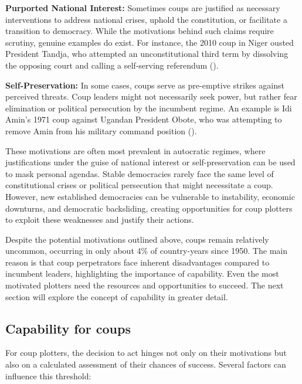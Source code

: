 \documentclass[
  12pt,
]{report}
\begin{document}
\textbf{Purported National Interest:} Sometimes coups are justified as
necessary interventions to address national crises, uphold the
constitution, or facilitate a transition to democracy. While the
motivations behind such claims require scrutiny, genuine examples do
exist. For instance, the 2010 coup in Niger ousted President Tandja, who
attempted an unconstitutional third term by dissolving the opposing
court and calling a self-serving referendum
().

\textbf{Self-Preservation:} In some cases, coups serve as pre-emptive
strikes against perceived threats. Coup leaders might not necessarily
seek power, but rather fear elimination or political persecution by the
incumbent regime. An example is Idi Amin's 1971 coup against Ugandan
President Obote, who was attempting to remove Amin from his military
command position ().

These motivations are often most prevalent in autocratic regimes, where
justifications under the guise of national interest or self-preservation
can be used to mask personal agendas. Stable democracies rarely face the
same level of constitutional crises or political persecution that might
necessitate a coup. However, new established democracies can be
vulnerable to instability, economic downturns, and democratic
backsliding, creating opportunities for coup plotters to exploit these
weaknesses and justify their actions.

Despite the potential motivations outlined above, coups remain
relatively uncommon, occurring in only about 4\% of country-years since
1950. The main reason is that coup perpetrators face inherent
disadvantages compared to incumbent leaders, highlighting the importance
of capability. Even the most motivated plotters need the resources and
opportunities to succeed. The next section will explore the concept of
capability in greater detail.

\subsection{Capability for coups}\label{capability-for-coups}

For coup plotters, the decision to act hinges not only on their
motivations but also on a calculated assessment of their chances of
success. Several factors can influence this threshold:
\end{document}
